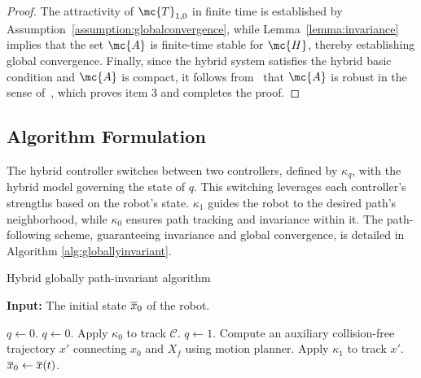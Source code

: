 {\begin{proof}
The attractivity of $\mc{T}_{1,0}$ in finite time is established by Assumption~\ref{assumption:globalconvergence}, while Lemma~\ref{lemma:invariance} implies that the set $\mc{A}$ is finite-time stable for $\mc{H}$, thereby establishing global convergence. Finally, since the hybrid system satisfies the hybrid basic condition and $\mc{A}$ is compact, it follows from~\cite[Theorem 3.26]{San2021} that $\mc{A}$ is robust in the sense of~\cite[Definition 3.16]{San2021}, which proves item 3 and completes the proof.
\end{proof}}

\subsection{Algorithm Formulation}
The hybrid controller switches between two controllers, defined by $\kappa_q$, with the hybrid model governing the state of $q$. This switching leverages each controller’s strengths based on the robot’s state. $\kappa_1$ guides the robot to the desired path’s neighborhood, while $\kappa_0$ ensures path tracking and invariance within it. The path-following scheme, guaranteeing invariance and global convergence, is detailed in Algorithm \ref{alg:globallyinvariant}.
{\footnotesize \begin{algorithm}[htbp]
    \caption{\footnotesize Hybrid globally path-invariant algorithm}\label{alg:globallyinvariant}
    \hspace*{\algorithmicindent} \textbf{Input:} The initial state $\overline{x}_{0}$ of the robot.
    \footnotesize
\begin{algorithmic}[1]
\State $q\leftarrow 0$.
\State $q \leftarrow 0$.
\State Apply $\kappa_{0}$ to track $\mathcal{C}$.
\EndWhile
\Else
\State $q\leftarrow 1$.
\State Compute an auxiliary collision-free trajectory $x'$ connecting $x_0$ and $X_{f}$ using motion planner.
\State Apply $\kappa_1$ to track $x'$.
\EndWhile
\EndIf
\State $\overline{x}_{0}\leftarrow \overline{x}(t)$.
\EndWhile
\end{algorithmic}
\end{algorithm}}

